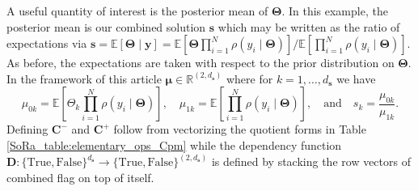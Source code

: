 \documentclass[graybox]{svmult}
\begin{document}
A useful quantity of interest is the posterior mean of $\boldsymbol{\Theta}$. In this example, the posterior mean is our combined solution $\boldsymbol{s}$ which may be written as the ratio of expectations via $\boldsymbol{s} = \mathbb{E}\left[\boldsymbol{\Theta} \mid \boldsymbol{y}\right] = \mathbb{E}\left[\boldsymbol{\Theta} \prod_{i=1}^{N} \rho(y_i \mid \boldsymbol{\Theta})\right]/\mathbb{E}\left[\prod_{i=1}^{N} \rho(y_i \mid \boldsymbol{\Theta})\right]$. As before, the expectations are taken with respect to the prior distribution on $\boldsymbol{\Theta}$. In the framework of this article $\boldsymbol{\mu} \in \mathbb{R}^{(2, d_{\boldsymbol{s}})}$ where for $k=1,\dots,d_{\boldsymbol{s}}$ we have 
$$\mu_{0k} = \mathbb{E}\left[\Theta_k \prod_{i=1}^{N} \rho(y_i \mid \boldsymbol{\Theta})\right], \quad \mu_{1k} = \mathbb{E}\left[\prod_{i=1}^{N} \rho(y_i \mid \boldsymbol{\Theta})\right], \quad \text{and} \quad s_k = \frac{\mu_{0k}}{\mu_{1k}}.$$
Defining $\boldsymbol{C}^-$ and $\boldsymbol{C}^+$ follow from vectorizing the quotient forms in Table \ref{SoRa_table:elementary_ops_Cpm} while the dependency function $\boldsymbol{D}: \{\text{True},\text{False}\}^{d_{\boldsymbol{s}}} \to \{\text{True},\text{False}\}^{(2, d_{\boldsymbol{s}})}$ is defined by stacking the row vectors of combined flag on top of itself. 


\end{document}
